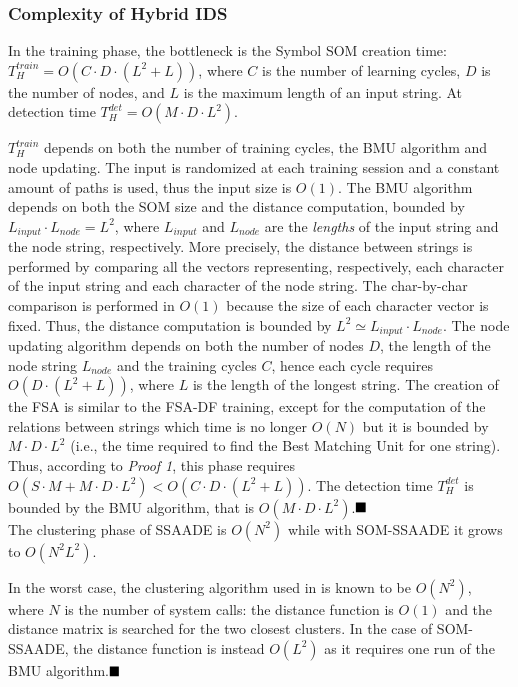 \subsubsection{Complexity of Hybrid IDS}
In the training phase, the bottleneck is the Symbol \ac{SOM} creation time: $T^{train}_{H} = O(C \cdot D \cdot (L^{2} + L))$, where $C$ is the number of learning cycles, $D$ is the number of nodes, and $L$ is the maximum length of an input string. At detection time $T^{det}_{H} = O(M \cdot D \cdot L^{2})$.

$T^{train}_{H}$ depends on both the number of training cycles, the BMU algorithm and node updating. The input is randomized at each training session and a constant amount of paths is used, thus the input size is $O(1)$. The \ac{BMU} algorithm depends on both the \ac{SOM} size and the distance computation, bounded by $L_{input} \cdot L_{node}=L^{2}$, where $L_{input}$ and $L_{node}$ are the \emph{lengths} of the input string and the node string, respectively. More precisely, the distance between strings is performed by comparing all the vectors representing, respectively, each character of the input string and each character of the node string. The char-by-char comparison is performed in $O(1)$ because the size of each character vector is fixed. Thus, the distance computation is bounded by $L^{2} \simeq L_{input} \cdot L_{node}$. The node updating algorithm depends on both the number of nodes $D$, the length of the node string $L_{node}$ and the training cycles $C$, hence each cycle requires $O(D \cdot (L^{2} + L))$, where $L$ is the length of the longest string. The creation of the \ac{FSA} is similar to the FSA-DF training, except for the computation of the relations between strings which time is no longer $O(N)$ but it is bounded by $M \cdot D \cdot L^{2}$ (i.e., the time required to find the Best Matching Unit for one string). Thus, according to \emph{Proof 1}, this phase requires $O(S \cdot M + M \cdot D \cdot L^{2}) < O(C \cdot D \cdot (L^{2} + L))$. The detection time $T_{H}^{det}$ is bounded by the \ac{BMU} algorithm, that is $O(M \cdot D \cdot L^{2})$.\hfill$\qed$\\

The clustering phase of \ac{SSAADE} is $O(N^{2})$ while with SOM-\ac{SSAADE} it grows to $O(N^{2}L^{2})$.

In the worst case, the clustering algorithm used in \citep{10.1109/TDSC.2008.69} is known to be $O(N^{2})$, where $N$ is the number of system calls: the distance function is $O(1)$ and the distance matrix is searched for the two closest clusters. In the case of SOM-\ac{SSAADE}, the distance function is instead $O(L^{2})$ as it requires one run of the \ac{BMU} algorithm.\hfill$\qed$

